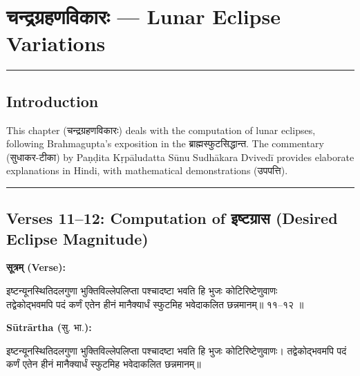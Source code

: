 \documentclass[11pt,a4paper]{article}
\newcommand{\dev}[1]{{\devanagarifont #1}}
\newcommand{\arth}{\textbf{Sūtrārtha (}\dev{सु. भा.}\textbf{):}\ }
\newenvironment{sanskritverse}{%
  \begin{center}\begin{minipage}{0.9\textwidth}
  \setlength{\leftskip}{1em}
  \setlength{\rightskip}{1em}
  \dev
}{\end{minipage}\end{center}}
\begin{document}
\tableofcontents
\newpage


\section{\dev{चन्द्रग्रहणविकारः} — Lunar Eclipse Variations}
\label{sec:chandra-grahana}

\thispagestyle{fancy}

\begin{center}
\textcolor{rulecolor}{\rule{0.8\textwidth}{0.5pt}}
\end{center}

\subsection*{Introduction}

This chapter (\dev{चन्द्रग्रहणविकारः}) deals with the computation of lunar eclipses,
following Brahmagupta's exposition in the \dev{ब्राह्मस्फुटसिद्धान्त}. The commentary
(\dev{सुधाकर-टीका}) by Paṇḍita Kṛpāludatta Sūnu Sudhākara Dvivedī provides
elaborate explanations in Hindi, with mathematical demonstrations (\dev{उपपत्ति}).

\begin{center}
\textcolor{rulecolor}{\rule{0.8\textwidth}{0.5pt}}
\end{center}

\subsection{Verses 11--12: Computation of \dev{इष्टग्रास} (Desired Eclipse Magnitude)}

\vspace{0.5em}
\noindent\textbf{\dev{सूत्रम् (Verse):}}
\begin{sanskritverse}
इष्टन्यूनस्थितिदलगुणा भुक्तिविल्लेपलिप्ता पश्चादष्टा भवति हि भुजः कोटिरिष्टेणुवाणः \\
तद्वेकोद्भवमपि पदं कर्णं एतेन हीनं मानैक्यार्धं स्फुटमिह भवेदाकलित छन्नमानम्॥ ११--१२ ॥
\end{sanskritverse}

\vspace{0.5em}
\noindent\arth
\begin{sanskritverse}
इष्टन्यूनस्थितिदलगुणा भुक्तिविल्लेपलिप्ता पश्चादष्टा भवति हि भुजः कोटिरिष्टेणुवाणः।
तद्वेकोद्भवमपि पदं कर्णं एतेन हीनं मानैक्यार्धं स्फुटमिह भवेदाकलित छन्नमानम्॥
\end{sanskritverse}
\end{document}
